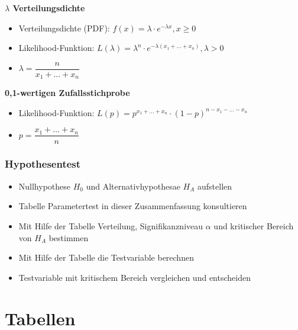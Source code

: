 \documentclass[8pt,a4paper]{scrartcl}
\begin{document}
\begin{multicols*}{3}
					\textbf{$\lambda$ Verteilungsdichte}
					\begin{itemize}\itemsep0pt				
						\item Verteilungsdichte (PDF): $f(x) = \lambda \cdot e^{-\lambda x}, x \geq 0$
						\item Likelihood-Funktion: $L(\lambda) = \lambda^{n}\cdot e^{-\lambda(x_{1}+...+x_{n})}, \lambda > 0$
						\item $\lambda = \dfrac{n}{x_{1}+...+x_{n}} $
					\end{itemize}	
					
					
					
					\textbf{0,1-wertigen Zufallsstichprobe}
					\begin{itemize}\itemsep0pt				
						\item Likelihood-Funktion: $L(p) = p^{x_{1}+...+x_{n}}\cdot (1-p)^{n-x_{1}-...-x_{n}}$
						\item $p = \dfrac{x_{1}+...+x_{n}}{n} $
					\end{itemize}	

			\subsubsection{Hypothesentest}	
				\begin{itemize}\itemsep0pt				
					\item Nullhypothese $H_{0}$ und Alternativhypothesae $H_{A}$ aufstellen
					\item Tabelle Parametertest in dieser Zusammenfassung konsultieren
					\item Mit Hilfe der Tabelle Verteilung, Signifikanzniveau $\alpha$ und kritischer Bereich von $H_{A}$ bestimmen
					\item Mit Hilfe der Tabelle die Testvariable berechnen
					\item Testvariable mit kritischem Bereich vergleichen und entscheiden
				\end{itemize}	

\end{multicols*}

\section{Tabellen}
\setlength{\columnseprule}{0.4pt}
\end{document}
